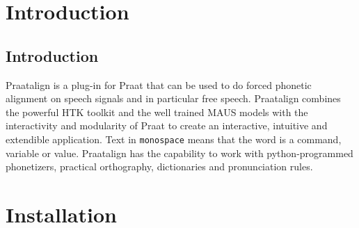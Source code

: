 
\cleardoublepage%
\maketitle
\setcounter{page}{1}
\tableofcontents
\chapter{Introduction}
\section{Introduction}
Praatalign is a plug-in for Praat that can be used to do forced phonetic
alignment on speech signals and in particular free speech. Praatalign combines
the powerful HTK toolkit and the well trained MAUS models with the
interactivity and modularity of Praat to create an interactive, intuitive and
extendible application. Text in \texttt{monospace} means that the word is a
command, variable or value. Praatalign has the capability to work with
python-programmed phonetizers, practical orthography, dictionaries and
pronunciation rules.

\chapter{Installation}
